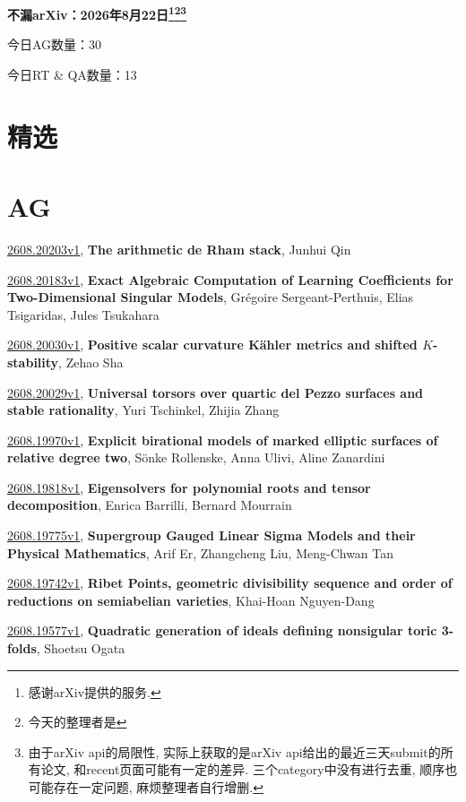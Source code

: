 \documentclass[9pt, a4paper]{article}
\theoremstyle{plain}
\theoremstyle{definition}
\theoremstyle{remark}
\newcommand{\arxiv}[3]{\href{https://arxiv.org/abs/#1}{#1}, \textbf{\textcolor{arxivblue}{#2}}, #3}
\newcommand{\AGnumber}{30}
\newcommand{\RTQAnumber}{13}
\newcommand{\NewestDate}{2026年8月22日}
\newcommand{\todayarXiver}{} %
\begin{document}
\begin{center}
    \Huge\textbf{不漏arXiv：\NewestDate\footnote{感谢arXiv提供的服务.}\footnote{今天的整理者是\todayarXiver}\footnote{由于arXiv api的局限性, 实际上获取的是arXiv api给出的最近三天submit的所有论文, 和recent页面可能有一定的差异. 三个category中没有进行去重, 顺序也可能存在一定问题, 麻烦整理者自行增删.}} \\
\end{center}

\setcounter{section}{-1}

\begin{center}
    今日AG数量：\AGnumber
    
    今日RT \& QA数量：\RTQAnumber
    
\end{center}


\section{精选}


\section{AG}
\arxiv{2608.20203v1}{The arithmetic de Rham stack}{Junhui Qin}

\arxiv{2608.20183v1}{Exact Algebraic Computation of Learning Coefficients for Two-Dimensional Singular Models}{Grégoire Sergeant-Perthuis, Elias Tsigaridas, Jules Tsukahara}

\arxiv{2608.20030v1}{Positive scalar curvature Kähler metrics and shifted $K$-stability}{Zehao Sha}

\arxiv{2608.20029v1}{Universal torsors over quartic del Pezzo surfaces and stable rationality}{Yuri Tschinkel, Zhijia Zhang}

\arxiv{2608.19970v1}{Explicit birational models of marked elliptic surfaces of relative degree two}{Sönke Rollenske, Anna Ulivi, Aline Zanardini}

\arxiv{2608.19818v1}{Eigensolvers for polynomial roots and tensor decomposition}{Enrica Barrilli, Bernard Mourrain}

\arxiv{2608.19775v1}{Supergroup Gauged Linear Sigma Models and their Physical Mathematics}{Arif Er, Zhangcheng Liu, Meng-Chwan Tan}

\arxiv{2608.19742v1}{Ribet Points, geometric divisibility sequence and order of reductions on semiabelian varieties}{Khai-Hoan Nguyen-Dang}

\arxiv{2608.19577v1}{Quadratic generation of ideals defining nonsigular toric 3-folds}{Shoetsu Ogata}
\end{document}
